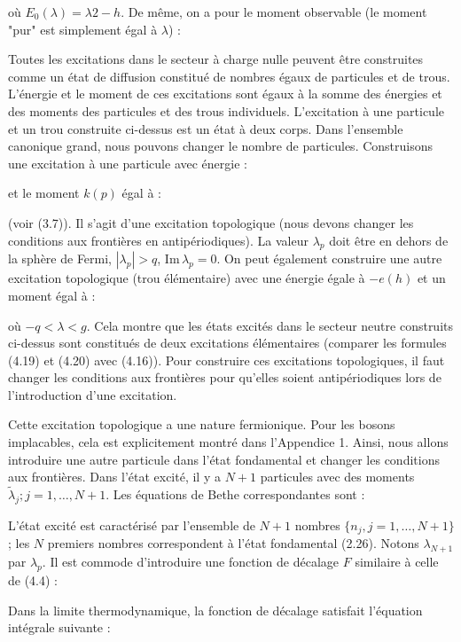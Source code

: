 où \( E_0(\lambda) = \lambda2 - h \). De même, on a pour le moment observable (le moment "pur" est simplement égal à $\lambda$) :

Toutes les excitations dans le secteur à charge nulle peuvent être construites comme un état de diffusion constitué de nombres égaux de particules et de trous. L'énergie et le moment de ces excitations sont égaux à la somme des énergies et des moments des particules et des trous individuels. L'excitation à une particule et un trou construite ci-dessus est un état à deux corps. Dans l'ensemble canonique grand, nous pouvons changer le nombre de particules. Construisons une excitation à une particule avec énergie :

et le moment \( k(p) \) égal à :

(voir (3.7)). Il s'agit d'une excitation topologique (nous devons changer les conditions aux frontières en antipériodiques). La valeur \( \lambda_p \) doit être en dehors de la sphère de Fermi, \( |\lambda_p| > q \), \( \text{Im} \, \lambda_p = 0 \). On peut également construire une autre excitation topologique (trou élémentaire) avec une énergie égale à \( -e(h) \) et un moment égal à :

où \( -q < \lambda < g \). Cela montre que les états excités dans le secteur neutre construits ci-dessus sont constitués de deux excitations élémentaires (comparer les formules (4.19) et (4.20) avec (4.16)). Pour construire ces excitations topologiques, il faut changer les conditions aux frontières pour qu'elles soient antipériodiques lors de l'introduction d'une excitation.

Cette excitation topologique a une nature fermionique. Pour les bosons implacables, cela est explicitement montré dans l'Appendice 1. Ainsi, nous allons introduire une autre particule dans l'état fondamental et changer les conditions aux frontières.
Dans l'état excité, il y a \( N + 1 \) particules avec des moments \( \tilde{\lambda}_j; j = 1, \dots, N + 1 \). Les équations de Bethe correspondantes sont :

L'état excité est caractérisé par l'ensemble de \( N + 1 \) nombres \( \{ n_j, j = 1, \dots, N + 1 \} \); les \( N \) premiers nombres correspondent à l'état fondamental (2.26). Notons \( \lambda_{N+1} \) par \( \lambda_p \). Il est commode d'introduire une fonction de décalage \( F \) similaire à celle de (4.4) :

Dans la limite thermodynamique, la fonction de décalage satisfait l'équation intégrale suivante :

